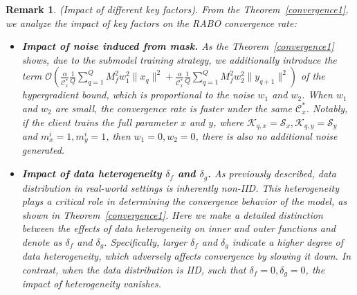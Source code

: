 \documentclass[lettersize,journal]{IEEEtran}
\newtheorem{remark}{Remark}
\begin{document}
\begin{remark}
(Impact of different key factors). From the Theorem~\ref{convergence1}, we
analyze the impact of key factors on the \textit{RABO} convergence rate:
\begin{itemize}
    \item \textbf{Impact of noise induced from mask.} As the Theorem~\ref{convergence1} shows, 
    due to the submodel training strategy, we additionally introduce the term $\mathcal{O}(\frac{\alpha}{\mathcal{C}_x^*}\frac{1}{Q}\sum_{q=1}^QM_f^2 w_1^2 \|x_q\|^2+\frac{\alpha}{\mathcal{C}_x^*}\frac{1}{Q}\sum_{q=1}^QM_f^2 w_2^2 \|y_{q+1}\|^2)$ of the hypergradient bound, which is proportional to the noise $w_1$ and $w_2$. When $w_1$ and $w_2$ are small, the convergence rate is faster under the same $\mathcal{C}^*_x$.
    Notably, if the client trains the full parameter $x$ and $y$, where $\mathcal{K}_{q,x}=\mathcal{S}_x, \mathcal{K}_{q,y}=\mathcal{S}_y$ and $m_x^i=1, m_y^i=1$, then $w_1=0, w_2=0$, there is also no additional noise generated.
    \item \textbf{Impact of data heterogeneity $\delta_f$ and $\delta_g$.} As previously described, data distribution in real-world settings is inherently non-IID. This heterogeneity plays a critical role in determining the convergence behavior of the model, as shown in Theorem~\ref{convergence1}. Here we make a detailed distinction between the effects of data heterogeneity on inner and outer functions and denote as $\delta_f$ and $\delta_g$. 
    Specifically, larger $\delta_f$ and $\delta_g$ indicate a higher degree of data heterogeneity, which adversely affects convergence by slowing it down. In contrast, when the data distribution is IID, such that $\delta_f = 0, \delta_g=0$, the impact of heterogeneity vanishes.
\end{itemize}
\end{remark}
\end{document}
